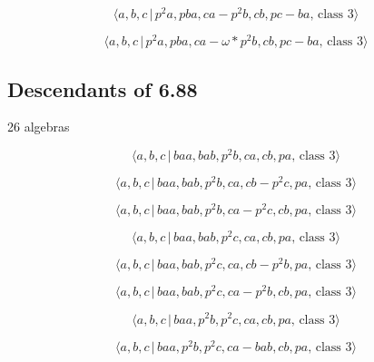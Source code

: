 \documentclass[10pt]{article}
\begin{document}
\begin{equation}
\langle a,b,c\,|\,p^2a,pba,ca-p^2b,cb,pc-ba,\,\text{class }3\rangle 
\tag{7.2633}
\end{equation}

\begin{equation}
\langle a,b,c\,|\,p^{2}a,pba,ca-\omega \ast p^{2}b,cb,pc-ba,\,\text{class }%
3\rangle  \tag{7.2634}
\end{equation}

\subsection{Descendants of 6.88}

26 algebras

\begin{equation}
\langle a,b,c\,|\,baa,bab,p^2b,ca,cb,pa,\,\text{class }3\rangle  \tag{7.2635}
\end{equation}

\begin{equation}
\langle a,b,c\,|\,baa,bab,p^2b,ca,cb-p^2c,pa,\,\text{class }3\rangle 
\tag{7.2636}
\end{equation}

\begin{equation}
\langle a,b,c\,|\,baa,bab,p^2b,ca-p^2c,cb,pa,\,\text{class }3\rangle 
\tag{7.2637}
\end{equation}

\begin{equation}
\langle a,b,c\,|\,baa,bab,p^2c,ca,cb,pa,\,\text{class }3\rangle  \tag{7.2638}
\end{equation}

\begin{equation}
\langle a,b,c\,|\,baa,bab,p^2c,ca,cb-p^2b,pa,\,\text{class }3\rangle 
\tag{7.2639}
\end{equation}

\begin{equation}
\langle a,b,c\,|\,baa,bab,p^2c,ca-p^2b,cb,pa,\,\text{class }3\rangle 
\tag{7.2640}
\end{equation}

\begin{equation}
\langle a,b,c\,|\,baa,p^2b,p^2c,ca,cb,pa,\,\text{class }3\rangle 
\tag{7.2641}
\end{equation}

\begin{equation}
\langle a,b,c\,|\,baa,p^2b,p^2c,ca-bab,cb,pa,\,\text{class }3\rangle 
\tag{7.2642}
\end{equation}
\end{document}
